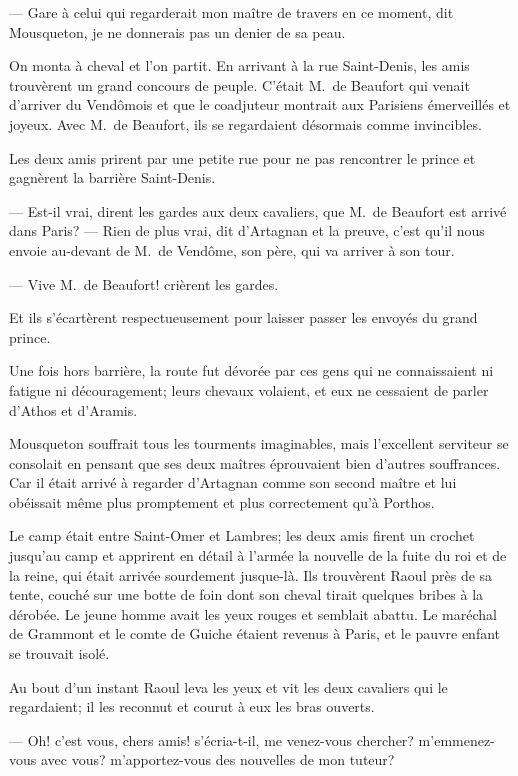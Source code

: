 — Gare à celui qui regarderait mon maître de travers en ce moment, dit Mousqueton, je ne donnerais pas un denier de sa peau.

On monta à cheval et l'on partit. En arrivant à la rue Saint-Denis, les amis trouvèrent un grand concours de peuple. C'était
M.~de Beaufort qui venait d'arriver du Vendômois et que le coadjuteur montrait aux Parisiens émerveillés et joyeux.
Avec M.~de Beaufort, ils se regardaient désormais comme invincibles.

Les deux amis prirent par une petite rue pour ne pas rencontrer le prince et gagnèrent la barrière Saint-Denis.

— Est-il vrai, dirent les gardes aux deux cavaliers, que M.~de Beaufort est arrivé dans Paris?
— Rien de plus vrai, dit d'Artagnan et la preuve, c'est qu'il nous envoie au-devant de M.~de Vendôme, son père, qui va arriver à son tour.

— Vive M.~de Beaufort! crièrent les gardes.

Et ils s'écartèrent respectueusement pour laisser passer les envoyés du grand prince.

Une fois hors barrière, la route fut dévorée par ces gens qui ne connaissaient ni fatigue ni découragement; leurs chevaux volaient, et eux ne cessaient de parler d'Athos et d'Aramis.

Mousqueton souffrait tous les tourments imaginables, mais l'excellent serviteur se consolait en pensant que ses deux maîtres éprouvaient bien d'autres souffrances. Car il était arrivé à regarder d'Artagnan comme son second maître et lui obéissait même plus promptement et plus correctement qu'à Porthos.

Le camp était entre Saint-Omer et Lambres; les deux amis firent un crochet jusqu'au camp et apprirent en détail à l'armée la nouvelle de la fuite du roi et de la reine, qui était arrivée sourdement jusque-là. Ils trouvèrent Raoul près de sa tente, couché sur une botte de foin dont son cheval tirait quelques bribes à la dérobée. Le jeune homme avait les yeux rouges et semblait abattu. Le maréchal de Grammont et le comte de Guiche étaient revenus à Paris, et le pauvre enfant se trouvait isolé.

Au bout d'un instant Raoul leva les yeux et vit les deux cavaliers qui le regardaient; il les reconnut et courut à eux les bras ouverts.

— Oh! c'est vous, chers amis! s'écria-t-il, me venez-vous chercher? m'emmenez-vous avec vous? m'apportez-vous des nouvelles de mon tuteur?

